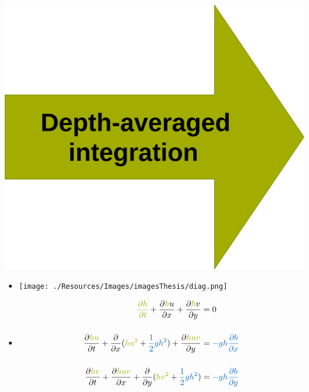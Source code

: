 \begin{frame}
\begin{minipage}{0.15\textwidth}
\begin{itemize}
\includegraphics[width=1.2\textwidth]{Resources/Images/arrow3.png}\\
\end{itemize}           
\end{minipage}
\hspace{1.5cm}
\vspace{-1cm}
\begin{minipage}{0.4\textwidth}
\begin{itemize}
\item<3->[]
\centering
\texttt{[image: ./Resources/Images/imagesThesis/diag.png]}
\item<3->[]
\begin{tcolorbox}[title=SWE model, colback=white] 
\begin{align*}
\myTUMgreen{\frac{\partial h}{\partial t}} + \frac{\partial \myTUMgreen{h}u}{\partial x} + \frac{\partial \myTUMgreen{h}v}{\partial y} &= 0\\[0.5cm]
\frac{\partial \myTUMgreen{hu}}{\partial t} + \frac{\partial}{\partial x}(\myTUMgreen{hu^2} + \myTUMdarkblue{\frac{1}{2} g h^2}) + \frac{\partial \myTUMgreen{huv}}{\partial y} &= \myTUMdarkblue{- gh\frac{\partial b}{\partial x}} \\[0.5cm]
\frac{\partial \myTUMgreen{hv}}{\partial t} + \frac{\partial \myTUMgreen{huv}}{\partial x} + \frac{\partial}{\partial y}(\myTUMgreen{hv^2} + \myTUMdarkblue{\frac{1}{2} g h^2})&= \myTUMdarkblue{- gh\frac{\partial b}{\partial y} }
\end{align*}
\end{tcolorbox}
\end{itemize}
\end{minipage}
\end{frame}
\clearpage



